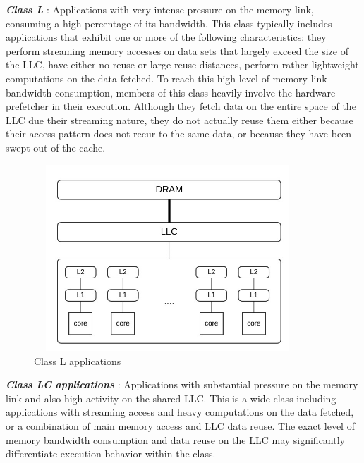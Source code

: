 \documentclass[diploma]{Styles/softlab-thesis}
\begin{document}
\textbf{\emph{Class L}} : Applications with very intense pressure on the memory link, consuming a high percentage of its bandwidth. This class typically includes applications that exhibit one or more of the following characteristics: they perform streaming memory accesses on data sets that largely exceed the size of the LLC, have either no reuse or large reuse distances, perform rather lightweight computations on the data fetched. To reach this high level of memory link bandwidth consumption, members of this class heavily involve the hardware prefetcher in their execution. Although they fetch data on the entire space of the LLC due their streaming nature, they do not actually reuse them either because their access pattern does not recur to the same data, or because they have been swept out of the cache. \\ 

\begin{figure}[ht!]
\begin{center}
\includegraphics[width=100mm, height=70mm]{images/category_L.jpg}
\caption{Class L applications \label{overflow}}
\end{center}
\end{figure}

\textbf{\emph{Class LC applications}} : Applications with substantial pressure on the memory link and also high activity on the shared LLC. This is a wide class including applications with streaming access and heavy computations on the data fetched, or a combination of main memory access and LLC data reuse. The exact level of memory bandwidth consumption and data reuse on the LLC may significantly differentiate execution behavior within the class. \\\ 
\end{document}
